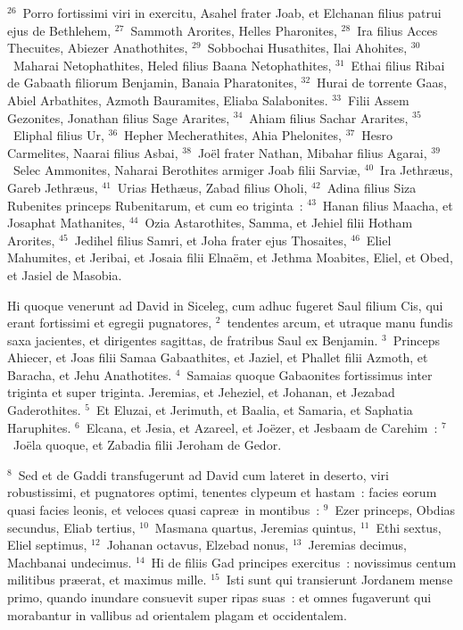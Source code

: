 ${}^{26}$~Porro fortissimi viri in exercitu, Asahel frater Joab, et Elchanan filius patrui ejus de Bethlehem,
${}^{27}$~Sammoth Arorites, Helles Pharonites,
${}^{28}$~Ira filius Acces Thecuites, Abiezer Anathothites,
${}^{29}$~Sobbochai Husathites, Ilai Ahohites,
${}^{30}$~Maharai Netophathites, Heled filius Baana Netophathites,
${}^{31}$~Ethai filius Ribai de Gabaath filiorum Benjamin, Banaia Pharatonites,
${}^{32}$~Hurai de torrente Gaas, Abiel Arbathites, Azmoth Bauramites, Eliaba Salabonites.
${}^{33}$~Filii Assem Gezonites, Jonathan filius Sage Ararites,
${}^{34}$~Ahiam filius Sachar Ararites,
${}^{35}$~Eliphal filius Ur,
${}^{36}$~Hepher Mecherathites, Ahia Phelonites,
${}^{37}$~Hesro Carmelites, Naarai filius Asbai,
${}^{38}$~Jo\"el frater Nathan, Mibahar filius Agarai,
${}^{39}$~Selec Ammonites, Naharai Berothites armiger Joab filii Sarvi\ae ,
${}^{40}$~Ira Jethr\ae us, Gareb Jethr\ae us,
${}^{41}$~Urias Heth\ae us, Zabad filius Oholi,
${}^{42}$~Adina filius Siza Rubenites princeps Rubenitarum, et cum eo triginta~:
${}^{43}$~Hanan filius Maacha, et Josaphat Mathanites,
${}^{44}$~Ozia Astarothites, Samma, et Jehiel filii Hotham Arorites,
${}^{45}$~Jedihel filius Samri, et Joha frater ejus Thosaites,
${}^{46}$~Eliel Mahumites, et Jeribai, et Josaia filii Elna\"em, et Jethma Moabites, Eliel, et Obed, et Jasiel de Masobia.

\bchapter
\lettrine[lines=3,image=true,loversize=0.05,lraise=-0.03]{H}{}i quoque venerunt ad David in Siceleg, cum adhuc fugeret Saul filium Cis, qui erant fortissimi et egregii pugnatores,
${}^{2}$~tendentes arcum, et utraque manu fundis saxa jacientes, et dirigentes sagittas, de fratribus Saul ex Benjamin.
${}^{3}$~Princeps Ahiecer, et Joas filii Samaa Gabaathites, et Jaziel, et Phallet filii Azmoth, et Baracha, et Jehu Anathotites.
${}^{4}$~Samaias quoque Gabaonites fortissimus inter triginta et super triginta. Jeremias, et Jeheziel, et Johanan, et Jezabad Gaderothites.
${}^{5}$~Et Eluzai, et Jerimuth, et Baalia, et Samaria, et Saphatia Haruphites.
${}^{6}$~Elcana, et Jesia, et Azareel, et Jo\"ezer, et Jesbaam de Carehim~:
${}^{7}$~Jo\"ela quoque, et Zabadia filii Jeroham de Gedor.


${}^{8}$~Sed et de Gaddi transfugerunt ad David cum lateret in deserto, viri robustissimi, et pugnatores optimi, tenentes clypeum et hastam~: facies eorum quasi facies leonis, et veloces quasi capre\ae\ in montibus~:
${}^{9}$~Ezer princeps, Obdias secundus, Eliab tertius,
${}^{10}$~Masmana quartus, Jeremias quintus,
${}^{11}$~Ethi sextus, Eliel septimus,
${}^{12}$~Johanan octavus, Elzebad nonus,
${}^{13}$~Jeremias decimus, Machbanai undecimus.
${}^{14}$~Hi de filiis Gad principes exercitus~: novissimus centum militibus pr\ae erat, et maximus mille.
${}^{15}$~Isti sunt qui transierunt Jordanem mense primo, quando inundare consuevit super ripas suas~: et omnes fugaverunt qui morabantur in vallibus ad orientalem plagam et occidentalem.


